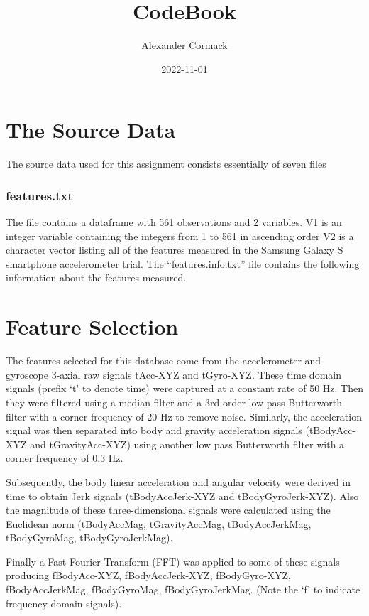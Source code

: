 \documentclass[
]{article}
\title{CodeBook}
\author{Alexander Cormack}
\date{2022-11-01}
\begin{document}
\maketitle

\hypertarget{the-source-data}{%
\section{The Source Data}\label{the-source-data}}

The source data used for this assignment consists essentially of seven
files

\hypertarget{features.txt}{%
\subsubsection{features.txt}\label{features.txt}}

The file contains a dataframe with 561 observations and 2 variables. V1
is an integer variable containing the integers from 1 to 561 in
ascending order V2 is a character vector listing all of the features
measured in the Samsung Galaxy S smartphone accelerometer trial. The
``features.info.txt'' file contains the following information about the
features measured.

\hypertarget{feature-selection}{%
\section{Feature Selection}\label{feature-selection}}

The features selected for this database come from the accelerometer and
gyroscope 3-axial raw signals tAcc-XYZ and tGyro-XYZ. These time domain
signals (prefix `t' to denote time) were captured at a constant rate of
50 Hz. Then they were filtered using a median filter and a 3rd order low
pass Butterworth filter with a corner frequency of 20 Hz to remove
noise. Similarly, the acceleration signal was then separated into body
and gravity acceleration signals (tBodyAcc-XYZ and tGravityAcc-XYZ)
using another low pass Butterworth filter with a corner frequency of 0.3
Hz.

Subsequently, the body linear acceleration and angular velocity were
derived in time to obtain Jerk signals (tBodyAccJerk-XYZ and
tBodyGyroJerk-XYZ). Also the magnitude of these three-dimensional
signals were calculated using the Euclidean norm (tBodyAccMag,
tGravityAccMag, tBodyAccJerkMag, tBodyGyroMag, tBodyGyroJerkMag).

Finally a Fast Fourier Transform (FFT) was applied to some of these
signals producing fBodyAcc-XYZ, fBodyAccJerk-XYZ, fBodyGyro-XYZ,
fBodyAccJerkMag, fBodyGyroMag, fBodyGyroJerkMag. (Note the `f' to
indicate frequency domain signals).
\end{document}
